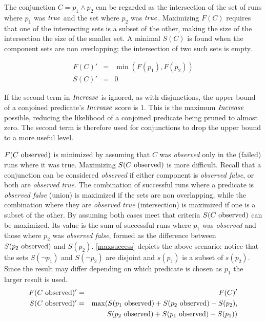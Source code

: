 The conjunction $C = p_1 \wedge p_2$ can be regarded as the intersection of the set of runs where $p_1$ was $\mathit{true}$ and the set where $p_2$ was $\mathit{true}$.  Maximizing $F(C)$ requires that one of the intersecting sets is a subset of the other, making the size of the intersection the size of the smaller set.  A minimal $S(C)$ is found when the component sets are non overlapping; the intersection of two such sets is empty.

\begin{eqnarray*}
  F(C)' &=&  \min(F(p_1),F(p_2)) \\
  S(C)' &=& 0
\end{eqnarray*}

If the second term in $\mathit{Increase}$ is ignored, as with disjunctions, the upper bound of a conjoined predicate's $\mathit{Increase}$ score is 1.  This is the maximum $\mathit{Increase}$ possible, reducing the likelihood of a conjoined predicate being pruned to almost zero.  The second term is therefore used for conjunctions to drop the upper bound to a more useful level.

$F(\text{$C$ observed})$ is minimized by assuming that $C$ was \textit{observed} only in the (failed) runs where it was true.  Maximizing $S(\text{$C$ observed})$ is more difficult.  Recall that a conjunction can be considered \textit{observed} if either component is \textit{observed false}, or both are \textit{observed true}.  The combination of successful runs where a predicate is \textit{observed false} (union) is maximized if the sets are non overlapping, while the combination where they are \textit{observed true} (intersection) is maximized if one is a subset of the other.  By assuming both cases meet that criteria $S(\text{$C$ observed})$ can be maximized.  Its value is the sum of successful runs where $p_1$ was \textit{observed} and those where $p_2$ was \textit{observed false}, formed as the difference between $S(\text{$p_2$ observed})$ and $S(p_2)$.  \autoref{maxsuccess} depicts the above scenario: notice that the sets $S(\neg p_1)$ and $S(\neg p_2)$ are disjoint and $s(p_1)$ is a subset of $s(p_2)$.  Since the result may differ depending on which predicate is chosen as $p_1$ the larger result is used.
\begin{eqnarray*}
  F(\text{$C$ observed})' &=& F(C)' \\
  S(\text{$C$ observed})' &=&
  \max(S(\text{$p_1$ observed}) + S(\text{$p_2$ observed}) - S(p_2),\\
  & &\ \ \ \ S(\text{$p_2$ observed}) + S(\text{$p_1$ observed}) - S(p_1))
\end{eqnarray*}

